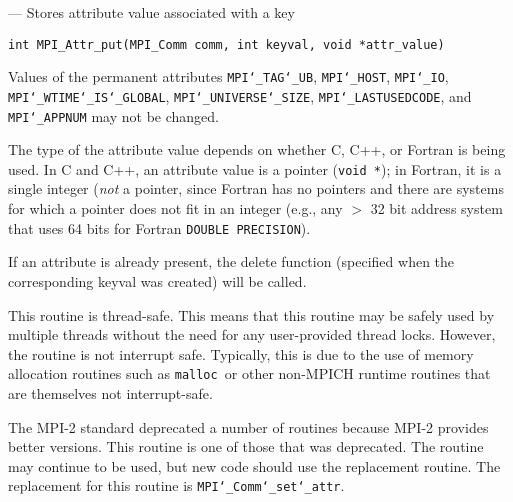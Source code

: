 \startmanpage
{}
--- Stores attribute value associated with a key 
\startvb\begin{verbatim}
int MPI_Attr_put(MPI_Comm comm, int keyval, void *attr_value)

\end{verbatim}
\endvb

\par
{}
Values of the permanent attributes {\tt MPI{\tt \char`\_}TAG{\tt \char`\_}UB}, {\tt MPI{\tt \char`\_}HOST}, {\tt MPI{\tt \char`\_}IO},
{\tt MPI{\tt \char`\_}WTIME{\tt \char`\_}IS{\tt \char`\_}GLOBAL}, {\tt MPI{\tt \char`\_}UNIVERSE{\tt \char`\_}SIZE}, {\tt MPI{\tt \char`\_}LASTUSEDCODE}, and
{\tt MPI{\tt \char`\_}APPNUM}  may not be changed.
\par
The type of the attribute value depends on whether C, C++, or Fortran
is being used.
In C and C++, an attribute value is a pointer ({\tt void *}); in Fortran,
it is a single
integer ({\em not} a pointer, since Fortran has no pointers and there are systems
for which a pointer does not fit in an integer (e.g., any $>$ 32 bit address
system that uses 64 bits for Fortran {\tt DOUBLE PRECISION}).
\par
If an attribute is already present, the delete function (specified when the
corresponding keyval was created) will be called.
\par
{}
\par
This routine is thread-safe.  This means that this routine may be
safely used by multiple threads without the need for any user-provided
thread locks.  However, the routine is not interrupt safe.  Typically,
this is due to the use of memory allocation routines such as {\tt malloc
}or other non-MPICH runtime routines that are themselves not interrupt-safe.
\par
{}
The MPI-2 standard deprecated a number of routines because MPI-2 provides
better versions.  This routine is one of those that was deprecated.  The
routine may continue to be used, but new code should use the replacement
routine.
The replacement for this routine is {\tt MPI{\tt \char`\_}Comm{\tt \char`\_}set{\tt \char`\_}attr}.
